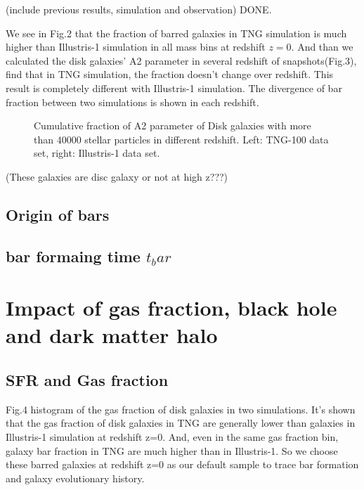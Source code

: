 (include previous results, simulation and observation) DONE.

We see in Fig.2 that the fraction of barred galaxies in TNG simulation is much higher than Illustris-1 simulation in all mass bins at redshift $z=0$.
And than we calculated the disk galaxies' A2 parameter in several redshift of snapshots(Fig.3), find that in TNG simulation, the fraction doesn't change over redshift. 
This result is completely different with Illustris-1 simulation.
The divergence of bar fraction between two simulations is shown in each redshift.


\label{subsec:tables}
\begin{figure*}[htbp]
\begin{center}
\caption{Cumulative fraction of A2 parameter of Disk galaxies with more than $40 000$ stellar particles in different redshift. Left: TNG-100 data set, right: Illustris-1 data set.}
\end{center}
\end{figure*}

(These galaxies are disc galaxy or not at high z???)


\subsection{Origin of bars}

\subsection{bar formaing time $t_bar$}


\section{Impact of gas fraction, black hole and dark matter halo} 
\subsection{SFR and Gas fraction}
Fig.4 histogram of the gas fraction of disk galaxies in two simulations. 
It's shown that the gas fraction of disk galaxies in TNG are generally lower than galaxies in Illustris-1 simulation at redshift z=0. 
And, even in the same gas fraction bin, galaxy bar fraction in TNG are much higher than in Illustris-1.
So we choose these barred galaxies at redshift z=0 as our default sample to trace bar formation and galaxy evolutionary history.

